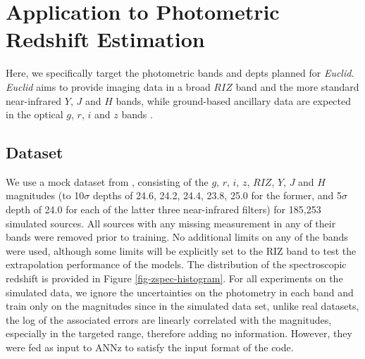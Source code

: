 \documentclass[useAMS,usenatbib,fleqn]{mn2e}
\begin{document}
\section{Application to Photometric Redshift Estimation}
\label{sec-application}

Here, we specifically target the photometric bands and depts planned for {\em Euclid}. {\em Euclid} aims to provide imaging data in a broad $RIZ$ band and the more standard near-infrared $Y$, $J$ and $H$ bands, while ground-based ancillary data are expected in the optical $g$, $r$, $i$ and $z$ bands \citep{laureijs2011}. 


\subsection{Dataset}
\label{sec-dataset}

We use a mock dataset from \citet{jouvel09}, consisting of the $g$, $r$, $i$, $z$, $RIZ$, $Y$, $J$ and $H$ magnitudes (to 10$\sigma$ depths of 24.6, 24.2, 24.4, 23.8, 25.0 for the former, and 5$\sigma$ depth of 24.0 for each of the latter three near-infrared filters) for 185,253 simulated sources. All sources with any missing measurement in any of their bands were removed prior to training. No additional limits on any of the bands were used, although some limits will be explicitly set to the RIZ band to test the extrapolation performance of the models. The distribution of the spectroscopic redshift is provided in Figure \ref{fig-zspec-histogram}. For all experiments on the simulated data, we ignore the uncertainties on the photometry in each band and train only on the magnitudes since in the simulated data set, unlike real datasets, the log of the associated errors are linearly correlated with the magnitudes, especially in the targeted range, therefore adding no information. However, they were fed as input to {\sc ANNz} to satisfy the input format of the code.
\end{document}

